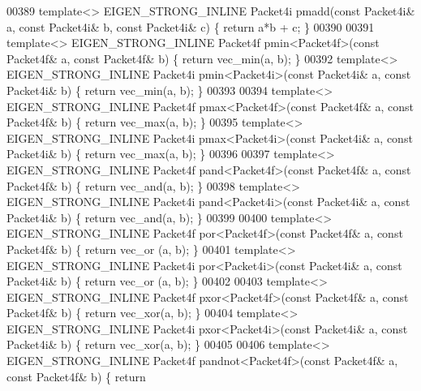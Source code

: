 \begin{DoxyCode}
{00389 \textcolor{keyword}{template}<> EIGEN\_STRONG\_INLINE Packet4i pmadd(\textcolor{keyword}{const} Packet4i& a, \textcolor{keyword}{const} Packet4i& b, \textcolor{keyword}{const} Packet4i& c) \{ \textcolor{keywordflow}{
      return} a*b + c; \}
00390 
00391 \textcolor{keyword}{template}<> EIGEN\_STRONG\_INLINE Packet4f pmin<Packet4f>(\textcolor{keyword}{const} Packet4f& a, \textcolor{keyword}{const} Packet4f& b) \{ \textcolor{keywordflow}{return} 
      vec\_min(a, b); \}
00392 \textcolor{keyword}{template}<> EIGEN\_STRONG\_INLINE Packet4i pmin<Packet4i>(\textcolor{keyword}{const} Packet4i& a, \textcolor{keyword}{const} Packet4i& b) \{ \textcolor{keywordflow}{return} 
      vec\_min(a, b); \}
00393 
00394 \textcolor{keyword}{template}<> EIGEN\_STRONG\_INLINE Packet4f pmax<Packet4f>(\textcolor{keyword}{const} Packet4f& a, \textcolor{keyword}{const} Packet4f& b) \{ \textcolor{keywordflow}{return} 
      vec\_max(a, b); \}
00395 \textcolor{keyword}{template}<> EIGEN\_STRONG\_INLINE Packet4i pmax<Packet4i>(\textcolor{keyword}{const} Packet4i& a, \textcolor{keyword}{const} Packet4i& b) \{ \textcolor{keywordflow}{return} 
      vec\_max(a, b); \}
00396 
00397 \textcolor{keyword}{template}<> EIGEN\_STRONG\_INLINE Packet4f pand<Packet4f>(\textcolor{keyword}{const} Packet4f& a, \textcolor{keyword}{const} Packet4f& b) \{ \textcolor{keywordflow}{return} 
      vec\_and(a, b); \}
00398 \textcolor{keyword}{template}<> EIGEN\_STRONG\_INLINE Packet4i pand<Packet4i>(\textcolor{keyword}{const} Packet4i& a, \textcolor{keyword}{const} Packet4i& b) \{ \textcolor{keywordflow}{return} 
      vec\_and(a, b); \}
00399 
00400 \textcolor{keyword}{template}<> EIGEN\_STRONG\_INLINE Packet4f por<Packet4f>(\textcolor{keyword}{const} Packet4f& a, \textcolor{keyword}{const} Packet4f& b) \{ \textcolor{keywordflow}{return} vec\_or
      (a, b); \}
00401 \textcolor{keyword}{template}<> EIGEN\_STRONG\_INLINE Packet4i por<Packet4i>(\textcolor{keyword}{const} Packet4i& a, \textcolor{keyword}{const} Packet4i& b) \{ \textcolor{keywordflow}{return} vec\_or
      (a, b); \}
00402 
00403 \textcolor{keyword}{template}<> EIGEN\_STRONG\_INLINE Packet4f pxor<Packet4f>(\textcolor{keyword}{const} Packet4f& a, \textcolor{keyword}{const} Packet4f& b) \{ \textcolor{keywordflow}{return} 
      vec\_xor(a, b); \}
00404 \textcolor{keyword}{template}<> EIGEN\_STRONG\_INLINE Packet4i pxor<Packet4i>(\textcolor{keyword}{const} Packet4i& a, \textcolor{keyword}{const} Packet4i& b) \{ \textcolor{keywordflow}{return} 
      vec\_xor(a, b); \}
00405 
00406 \textcolor{keyword}{template}<> EIGEN\_STRONG\_INLINE Packet4f pandnot<Packet4f>(\textcolor{keyword}{const} Packet4f& a, \textcolor{keyword}{const} Packet4f& b) \{ \textcolor{keywordflow}{return} 
}
\end{DoxyCode}
